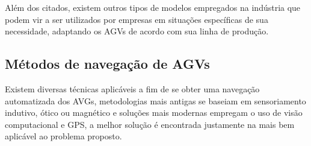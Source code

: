 Além dos citados, existem outros tipos de modelos empregados na indústria que
podem vir a ser utilizados por empresas em situações específicas de sua
necessidade, adaptando os AGVs de acordo com sua linha de produção.

\subsection{M{\'e}todos de navega{\c c}{\~a}o de AGVs}

Existem diversas técnicas aplicáveis a fim de se obter uma navegação
automatizada dos AVGs, metodologias mais antigas se baseiam em sensoriamento
indutivo, ótico ou magnético e soluções mais modernas empregam o uso de visão
computacional e GPS, a melhor solução é encontrada justamente na mais bem
aplicável ao problema proposto.

